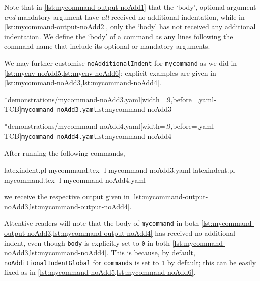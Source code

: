 	Note that in \cref{lst:mycommand-output-noAdd1} that the `body', optional argument \emph{and} mandatory argument have \emph{all} received no additional indentation, while in \cref{lst:mycommand-output-noAdd2}, only the `body' has not received any additional indentation.
	We define the `body' of a command as any lines following the command name that include its optional or mandatory arguments.

	We may further customise \texttt{noAdditionalIndent} for \texttt{mycommand} as we did in \vref{lst:myenv-noAdd5,lst:myenv-noAdd6}; explicit examples are given in \cref{lst:mycommand-noAdd3,lst:mycommand-noAdd4}.

	\begin{minipage}{.45\textwidth}
		\cmhlistingsfromfile[style=yaml-LST]*{demonstrations/mycommand-noAdd3.yaml}[width=.9\linewidth,before=\centering,yaml-TCB]{\texttt{mycommand-noAdd3.yaml}}{lst:mycommand-noAdd3}
	\end{minipage}
	\hfill
	\begin{minipage}{.45\textwidth}
		\cmhlistingsfromfile[style=yaml-LST]*{demonstrations/mycommand-noAdd4.yaml}[width=.9\linewidth,before=\centering,yaml-TCB]{\texttt{mycommand-noAdd4.yaml}}{lst:mycommand-noAdd4}
	\end{minipage}

	After running the following commands, \begin{commandshell}
latexindent.pl mycommand.tex -l mycommand-noAdd3.yaml  
latexindent.pl mycommand.tex -l mycommand-noAdd4.yaml  
\end{commandshell} we receive the respective output given in \cref{lst:mycommand-output-noAdd3,lst:mycommand-output-noAdd4}.

	\begin{minipage}{.45\textwidth}
	\end{minipage}
	\hfill
	\begin{minipage}{.45\textwidth}
	\end{minipage}

	Attentive readers will note that the body of \texttt{mycommand} in both \cref{lst:mycommand-output-noAdd3,lst:mycommand-output-noAdd4} has received no additional indent, even though \texttt{body} is explicitly set to \texttt{0} in both \cref{lst:mycommand-noAdd3,lst:mycommand-noAdd4}.
	This is because, by default, \texttt{noAdditionalIndentGlobal} for \texttt{commands} is set to \texttt{1} by default; this can be easily fixed as in \cref{lst:mycommand-noAdd5,lst:mycommand-noAdd6}.
	\label{page:command:noAddGlobal}

